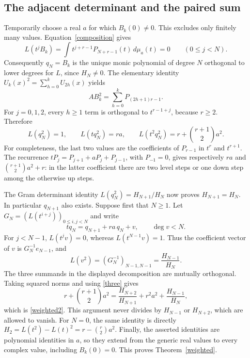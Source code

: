 \documentclass[10pt]{article}
\begin{document}
\subsection*{The adjacent determinant and the paired sum}
Temporarily choose a real $a$ for which $B_k(0)\ne0$.
This excludes only finitely many values. Equation~\eqref{composition}
gives
\[
 L(t^j B_k)=\int t^{j+r-1}P_{N+r-1}(t)\,d\mu_a(t)=0\qquad(0\le j<N).
\]
Consequently $q_N=B_k$ is the unique monic polynomial of degree $N$
orthogonal to lower degrees for $L$, since $H_N\ne0$.
The elementary identity $U_k(x)^2=\sum_{h=0}^k U_{2h}(x)$ yields
\begin{equation}\label{squared}
 A B_k^2=\sum_{h=0}^k P_{(2h+1)r-1}.
\end{equation}
For $j=0,1,2$, every $h\ge1$ term is orthogonal to $t^{r-1+j}$,
because $r\ge2$. Therefore
\begin{equation}\label{three}
 L(q_N^2)=1,\qquad L(tq_N^2)=ra,\qquad
 L(t^2q_N^2)=r+\binom{r+1}{2}a^2.
\end{equation}
For completeness, the last two values are the coefficients of
$P_{r-1}$ in $t^r$ and $t^{r+1}$. The recurrence
$tP_j=P_{j+1}+aP_j+P_{j-1}$, with $P_{-1}=0$, gives respectively
$ra$ and $\binom{r+1}{2}a^2+r$: in the latter coefficient there
are two level steps or one down step among the otherwise up steps.

The Gram determinant identity
$L(q_N^2)=H_{N+1}/H_N$ now proves $H_{N+1}=H_N$.
In particular $q_{N+1}$ also exists. Suppose first that $N\ge1$.
Let $G_N=(L(t^{i+j}))_{0\le i,j<N}$ and write
\[
 tq_N=q_{N+1}+ra\,q_N+v,\qquad \deg v<N.
\]
For $j<N-1$, $L(t^jv)=0$, whereas $L(t^{N-1}v)=1$.
Thus the coefficient vector of $v$ is $G_N^{-1}e_{N-1}$, and
\[
 L(v^2)=(G_N^{-1})_{N-1,N-1}=\frac{H_{N-1}}{H_N}.
\]
The three summands in the displayed decomposition are mutually
orthogonal. Taking squared norms and using \eqref{three} gives
\[
 r+\binom{r+1}{2}a^2
 =\frac{H_{N+2}}{H_{N+1}}+r^2a^2+\frac{H_{N-1}}{H_N},
\]
which is \eqref{weighted2}. This argument never divides by
$H_{N-1}$ or $H_{N+2}$, which are allowed to vanish.
For $N=0$, the same identity is directly
$H_2=L(t^2)-L(t)^2=r-\binom r2a^2$.
Finally, the asserted identities are polynomial identities in $a$,
so they extend from the generic real values to every complex value,
including $B_k(0)=0$. This proves Theorem~\ref{weighted}.
\end{document}
